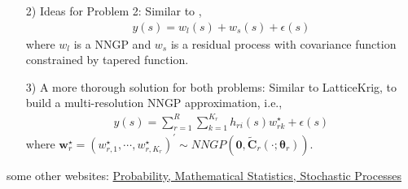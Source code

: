 \documentclass[
12pt, %
a4paper, %
oneside, %
headinclude,footinclude, %
BCOR5mm, %
]{scrartcl}
\begin{document}
\begin{itemize}
 \item [2)] Ideas for Problem 2: Similar to \href{https://chenyw68.github.io/Literature/[2012]A full scale approximation of covariance functions for large spatial data sets.pdf}{\cite{sang2012full}},
\begin{equation}
    \begin{aligned}
       y(s) = w_l(s) + w_s(s) + \epsilon(s)
    \end{aligned} \label{DP1}
\end{equation}
where $w_l$ is a NNGP and $w_s$ is a residual process with covariance function constrained by tapered function.
 \item [3)] A more thorough solution for both problems: Similar to LatticeKrig, to build a multi-resolution NNGP approximation, i.e.,
 \begin{equation}
\begin{aligned}
y(s) = \sum_{r = 1}^{R}\sum_{k = 1}^{K_r}h_{ri}(s)w_{rk}^{\star}  + \epsilon(s)
\end{aligned} \label{DP1}
\end{equation}
where $\boldsymbol{w}_r^{\star} = \left(w_{r, 1}^{\star}, \cdots, w_{r, K_r}^{\star}\right)^\prime \sim NNGP\left(\boldsymbol{0}, \boldsymbol{\tilde{C}}_r(\cdot; \boldsymbol{\theta}_r)\right)$.
\end{itemize}


some other websites: \href{http://www.randomservices.org/random/index.html}{Probability, Mathematical Statistics, Stochastic Processes}
%

\end{document}
